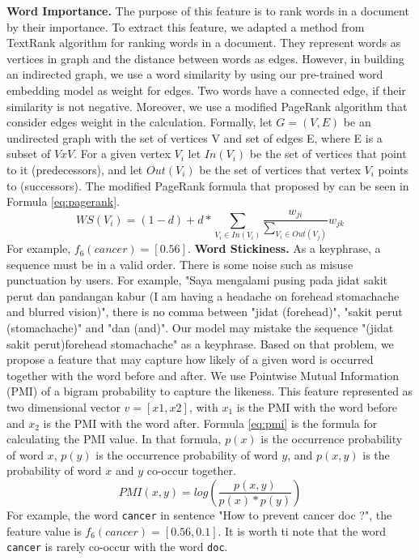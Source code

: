     \textbf{Word Importance.} The purpose of this feature is to rank words in a document by their importance. To extract this feature, we adapted a method from TextRank \cite{mihalcea2004textrank} algorithm for ranking words in a document. They represent words as vertices in graph and the distance between words as edges. However, in building an indirected graph, we use a word similarity by using our pre-trained word embedding model as weight for edges. Two words have a connected edge, if their similarity is not negative. Moreover, we use a modified PageRank \cite{page1999pagerank} algorithm that consider edges weight in the calculation. Formally, let $G = (V, E)$ be an undirected graph with the set of vertices V and set of edges E, where E is a subset of $VxV$. For a given vertex $V_i$ let $In(V_i)$ be the set of vertices that point to it (predecessors), and let $Out(V_i)$ be the set of vertices that vertex $V_i$ points to (successors). The modified PageRank formula that proposed by \cite{mihalcea2004textrank} can be seen in Formula \ref{eq:pagerank}.
        \begin{equation}\label{eq:pagerank}
        	WS(V_{i})=(1-d) + d * \sum_{V_{i} \in In(V_{i})} \frac{w_{ji}}{\sum_{V_{i} \in Out(V_{j})}}w_{jk}
        \end{equation}
    For example, $f_6(cancer) = [0.56]$.
    \textbf{Word Stickiness.} As a keyphrase, a sequence must be in a valid order. There is some noise such as misuse punctuation by users. For example, "Saya mengalami pusing pada jidat sakit perut dan pandangan kabur (I am having a headache on forehead stomachache and blurred vision)", there is no comma between "jidat (forehead)", "sakit perut (stomachache)" and "dan (and)". Our model may mistake the sequence "(jidat sakit perut)forehead stomachache" as a keyphrase. Based on that problem, we propose a feature that may capture how likely of a given word is occurred together with the word before and after. We use Pointwise Mutual Information (PMI) of a bigram probability to capture the likeness. This feature represented as two dimensional vector $v = [x1, x2]$, with $x_1$ is the PMI with the word before and $x_2$ is the PMI with the word after. Formula \ref{eq:pmi} is the formula for calculating the PMI value. In that formula, $p(x)$ is the occurrence probability of word $x$, $p(y)$ is the occurrence probability of word $y$, and $p(x, y)$ is the probability of word $x$ and $y$ co-occur together.
    \begin{equation}\label{eq:pmi}
	    PMI(x,y)=log(\frac{p(x, y)}{p(x)*p(y)})
    \end{equation}
    For example, the word \texttt{cancer} in sentence "How to prevent cancer doc ?", the feature value is $f_6(cancer) = [0.56, 0.1]$. It is worth ti note that the word \texttt{cancer} is rarely co-occur with the word \texttt{doc}.


